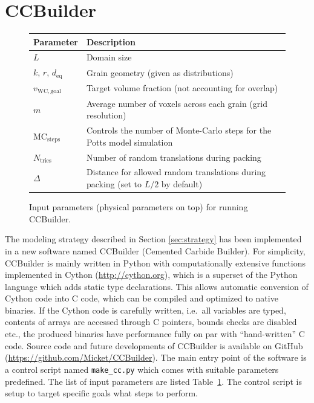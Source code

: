 \documentclass[3p,12pt]{elsarticle}
\newcommand{\WC}{\mathrm{WC}}
\begin{document}
\section{CCBuilder} \label{sec:ccbuilder}

\begin{figure}[H]
  \centering
  \begin{tabular}{l|l}
   \toprule
   Parameter & Description
   \\ \midrule
   $L$ & Domain size
   \\
   $k$, $r$, $d_\text{eq}$ & Grain geometry (given as distributions)
   \\
   $v_{\WC,\text{goal}}$ & Target volume fraction (not accounting for overlap)
   \\ \midrule
   $m$ & Average number of voxels across each grain (grid resolution)
   \\
   $\text{MC}_\text{steps}$ & Controls the number of Monte-Carlo steps for the Potts model simulation
   \\
   $N_\text{tries}$ & Number of random translations during packing
   \\
   $\Delta$ & Distance for allowed random translations during packing (set to $L/2$ by default)
   \\
   \bottomrule
  \end{tabular}
  \caption{\label{tab:input_data} Input parameters (physical parameters on top) for running CCBuilder.}
\end{figure}

The modeling strategy described in Section \ref{sec:strategy} has been implemented in a new software named CCBuilder (Cemented Carbide Builder).
For simplicity, CCBuilder is mainly written in Python with computationally extensive functions implemented in Cython (\url{http://cython.org}), which is a superset of the Python language which adds static type declarations.
This allows automatic conversion of Cython code into C code, which can be compiled and optimized to native binaries.
If the Cython code is carefully written, i.e.\ all variables are typed, contents of arrays are accessed through C pointers, bounds checks are disabled etc., the produced binaries have performance fully on par with ``hand-written'' C code.
Source code and future developments of CCBuilder is available on GitHub (\url{https://github.com/Micket/CCBuilder}).
The main entry point of the software is a control script named \verb+make_cc.py+ which comes with suitable parameters predefined.
The list of input parameters are listed Table~\ref{tab:input_data}.
The control script is setup to target specific goals what steps to perform.
\end{document}

